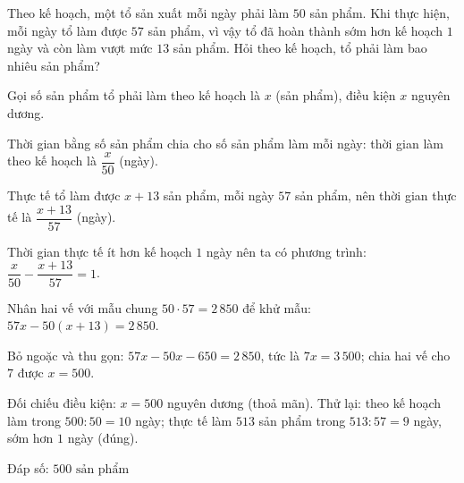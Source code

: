 \begin{problem}[8DS-PT1-008]
Theo kế hoạch, một tổ sản xuất mỗi ngày phải làm $50$ sản phẩm. Khi thực hiện, mỗi ngày tổ làm được $57$ sản phẩm, vì vậy tổ đã hoàn thành sớm hơn kế hoạch $1$ ngày và còn làm vượt mức $13$ sản phẩm. Hỏi theo kế hoạch, tổ phải làm bao nhiêu sản phẩm?

\begin{solution}
Gọi số sản phẩm tổ phải làm theo kế hoạch là $x$ (sản phẩm), điều kiện $x$ nguyên dương.

Thời gian bằng số sản phẩm chia cho số sản phẩm làm mỗi ngày: thời gian làm theo kế hoạch là $\dfrac{x}{50}$ (ngày).

Thực tế tổ làm được $x + 13$ sản phẩm, mỗi ngày $57$ sản phẩm, nên thời gian thực tế là $\dfrac{x + 13}{57}$ (ngày).

Thời gian thực tế ít hơn kế hoạch $1$ ngày nên ta có phương trình: $\dfrac{x}{50} - \dfrac{x + 13}{57} = 1$.

Nhân hai vế với mẫu chung $50 \cdot 57 = 2\,850$ để khử mẫu: $57x - 50(x + 13) = 2\,850$.

Bỏ ngoặc và thu gọn: $57x - 50x - 650 = 2\,850$, tức là $7x = 3\,500$; chia hai vế cho $7$ được $x = 500$.

Đối chiếu điều kiện: $x = 500$ nguyên dương (thoả mãn). Thử lại: theo kế hoạch làm trong $500 : 50 = 10$ ngày; thực tế làm $513$ sản phẩm trong $513 : 57 = 9$ ngày, sớm hơn $1$ ngày (đúng).

Đáp số: $\boxed{500 \text{ sản phẩm}}$
\end{solution}
\end{problem}

